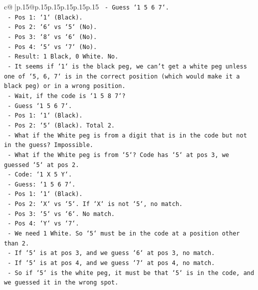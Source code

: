 \documentclass{article}
\begin{document}
{\begin{supertabular}{c@{$\;$}|p{.15\linewidth}@{}p{.15\linewidth}p{.15\linewidth}p{.15\linewidth}p{.15\linewidth}p{.15\linewidth}}
{{{\texttt{                {-}   Guess `1 5 6 7`.} \\
\texttt{                {-}   Pos 1: `1` (Black).} \\
\texttt{                {-}   Pos 2: `6` vs `5` (No).} \\
\texttt{                {-}   Pos 3: `8` vs `6` (No).} \\
\texttt{                {-}   Pos 4: `5` vs `7` (No).} \\
\texttt{                {-}   Result: 1 Black, 0 White. No.} \\
\texttt{            {-}   It seems if `1` is the black peg, we can't get a white peg unless one of `5, 6, 7` is in the correct position (which would make it a black peg) or in a wrong position.} \\
\texttt{            {-}   Wait, if the code is `1 5 8 7`?} \\
\texttt{                {-}   Guess `1 5 6 7`.} \\
\texttt{                {-}   Pos 1: `1` (Black).} \\
\texttt{                {-}   Pos 2: `5` (Black). Total 2.} \\
\texttt{            {-}   What if the White peg is from a digit that is in the code but not in the guess? Impossible.} \\
\texttt{            {-}   What if the White peg is from `5`? Code has `5` at pos 3, we guessed `5` at pos 2.} \\
\texttt{                {-}   Code: `1 X 5 Y`.} \\
\texttt{                {-}   Guess: `1 5 6 7`.} \\
\texttt{                {-}   Pos 1: `1` (Black).} \\
\texttt{                {-}   Pos 2: `X` vs `5`. If `X` is not `5`, no match.} \\
\texttt{                {-}   Pos 3: `5` vs `6`. No match.} \\
\texttt{                {-}   Pos 4: `Y` vs `7`.} \\
\texttt{                {-}   We need 1 White. So `5` must be in the code at a position other than 2.} \\
\texttt{                {-}   If `5` is at pos 3, and we guess `6` at pos 3, no match.} \\
\texttt{                {-}   If `5` is at pos 4, and we guess `7` at pos 4, no match.} \\
\texttt{                {-}   So if `5` is the white peg, it must be that `5` is in the code, and we guessed it in the wrong spot.} \\
}}}
\end{supertabular}}
\end{document}

